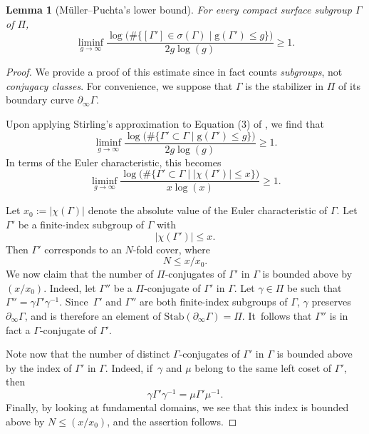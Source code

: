 \documentclass[JEP,XML,SOM,Unicode,NoEqCountersInSection,published]{cedram}
\theoremstyle{plain}
\newtheorem{lemma}[theorem]{Lemma}
\theoremstyle{definition}
\begin{document}
\begin{lemma}[Müller--Puchta's lower bound]\label{l.Muller_Puchta}
For every compact surface subgroup $\Gamma$ of $\Pi$,
\begin{equation}\label{eq.lower_bound_MP}
\liminf_{g\to\infty}\frac{\log\bigl(\#\{[\Gamma']\in\sigma(\Gamma)\mid \mathrm{g}(\Gamma')\leq g\}\bigr)}{2g\log(g)} \geq 1.
\end{equation}
\end{lemma}

\begin{proof}
We provide a proof of this estimate since \cite{Muller_Puchta} in fact counts \emph{subgroups}, not \emph{conjugacy classes}. For convenience, we suppose that $\Gamma$ is the stabilizer in $\Pi$ of its boundary curve $\partial_\infty\Gamma$.

Upon applying Stirling's approximation to Equation (3) of \cite{Muller_Puchta}, we find that
\begin{equation*}
\liminf_{g\to\infty}\frac{\log\bigl(\#\{\Gamma'\subset\Gamma\mid \mathrm{g}(\Gamma')\leq g\}\bigr)}{2g\log(g)} \geq 1.
\end{equation*}
In terms of the Euler characteristic, this becomes
\begin{equation*}
\liminf_{g\to\infty}\frac{\log\bigl(\#\{\Gamma'\subset\Gamma\mid \left|\chi(\Gamma')\right|\leq x\}\bigr)}{x\log(x)} \geq 1.
\end{equation*}

Let $x_0:=\left|\chi(\Gamma)\right|$ denote the absolute value of the Euler characteristic of $\Gamma$. Let $\Gamma'$ be a finite-index subgroup of $\Gamma$ with
\begin{equation*}
\left|\chi(\Gamma')\right| \leq x.
\end{equation*}
Then $\Gamma'$ corresponds to an $N$-fold cover, where
\begin{equation*}
N\leq x/x_0.
\end{equation*}
We now claim that the number of $\Pi$-conjugates of $\Gamma'$ in $\Gamma$ is bounded above by $(x/x_0)$. Indeed, let $\Gamma''$ be a $\Pi$-conjugate of $\Gamma'$ in $\Gamma$. Let $\gamma\in\Pi$ be such that $\Gamma''=\gamma\Gamma'\gamma^{-1}$. Since~$\Gamma'$ and $\Gamma''$ are both finite-index subgroups of $\Gamma$, $\gamma$ preserves $\partial_\infty\Gamma$, and is therefore an element of $\mathrm{Stab}(\partial_\infty\Gamma)=\Pi$. It~follows that $\Gamma''$ is in fact a $\Gamma$-conjugate of $\Gamma'$.

Note now that the number of distinct $\Gamma$-conjugates of $\Gamma'$ in $\Gamma$ is bounded above by the index of $\Gamma'$ in $\Gamma$. Indeed, if~$\gamma$ and $\mu$ belong to the same left coset of $\Gamma'$, then
\begin{equation*}
\gamma\Gamma'\gamma^{-1} = \mu\Gamma'\mu^{-1}.
\end{equation*}
Finally, by looking at fundamental domains, we see that this index is bounded above by $N\leq (x/x_0)$, and the assertion follows.


\end{proof}
\end{document}

